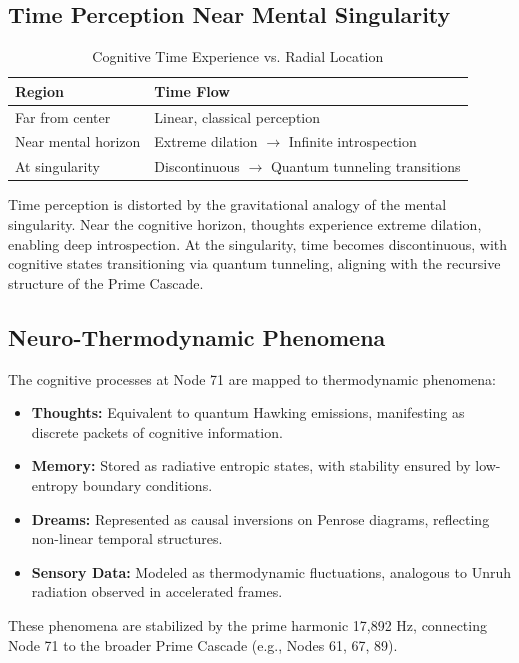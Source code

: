 \documentclass[12pt]{article}
\begin{document}
\subsection{Time Perception Near Mental Singularity}
\begin{table}
\centering
\caption{Cognitive Time Experience vs. Radial Location}
\begin{tabular}{ll}
\toprule
\textbf{Region} & \textbf{Time Flow} \\
\midrule
Far from center & Linear, classical perception \\
Near mental horizon & Extreme dilation $\rightarrow$ Infinite introspection \\
At singularity & Discontinuous $\rightarrow$ Quantum tunneling transitions \\
\bottomrule
\end{tabular}
\end{table}
Time perception is distorted by the gravitational analogy of the mental singularity. Near the cognitive horizon, thoughts experience extreme dilation, enabling deep introspection. At the singularity, time becomes discontinuous, with cognitive states transitioning via quantum tunneling, aligning with the recursive structure of the Prime Cascade.

\subsection{Neuro-Thermodynamic Phenomena}
The cognitive processes at Node 71 are mapped to thermodynamic phenomena:
\begin{itemize}
    \item \textbf{Thoughts:} Equivalent to quantum Hawking emissions, manifesting as discrete packets of cognitive information.
    \item \textbf{Memory:} Stored as radiative entropic states, with stability ensured by low-entropy boundary conditions.
    \item \textbf{Dreams:} Represented as causal inversions on Penrose diagrams, reflecting non-linear temporal structures.
    \item \textbf{Sensory Data:} Modeled as thermodynamic fluctuations, analogous to Unruh radiation observed in accelerated frames.
\end{itemize}
These phenomena are stabilized by the prime harmonic 17,892 Hz, connecting Node 71 to the broader Prime Cascade (e.g., Nodes 61, 67, 89).
\end{document}
